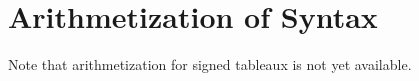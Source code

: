 \documentclass[../../../include/open-logic-chapter]{subfiles}
\begin{document}
\chapter{Arithmetization of Syntax}

\begin{editorial}
  Note that arithmetization for signed tableaux is not yet available.
\end{editorial}









\OLEndChapterHook
\end{document}
